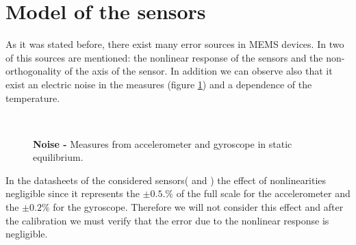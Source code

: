 \documentclass[conference]{IEEEtran}
\begin{document}
\section{Model of the sensors}
\label{sec:modelo}

As it was stated before, there exist many error sources in MEMS devices. In \cite{bib:calib_imu} two of this sources are mentioned: the nonlinear response of the sensors and the non-orthogonality of the axis of the sensor. In addition we can observe also that it exist an electric noise in the measures (figure \ref{fig:noise}) and a dependence of the temperature.\\
\vspace{-10pt}
\begin{figure}[h!]
  \centering
  \\[-5pt]
  			\vspace{-5pt}
  \caption{\textbf{Noise -} Measures from accelerometer and gyroscope in static equilibrium.}
  \label{fig:noise}
\end{figure}

In the datasheets of the considered sensors(\cite{bib:acc_data} and \cite{bib:gyro_data}) the effect of nonlinearities negligible since it represents the $\pm 0.5.\%$  of the full scale for the accelerometer and the $\pm 0.2\%$ for the gyroscope. Therefore we will not consider this effect and after the calibration we must verify that the error due to the nonlinear response is negligible.\\
\end{document}
